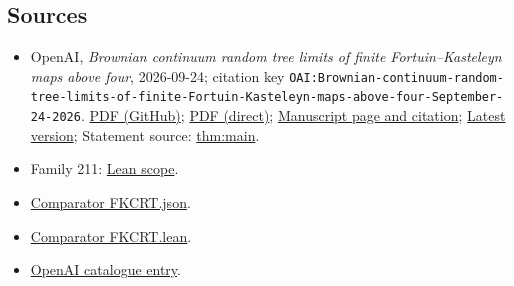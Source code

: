 \documentclass[11pt]{article}
\begin{document}
\subsection{Sources}
\begin{itemize}
\item OpenAI, \emph{Brownian continuum random tree limits of finite Fortuin–Kasteleyn maps above four}, 2026-09-24; citation key \texttt{OAI:Brownian-continuum-random-tree-limits-of-finite-Fortuin-Kasteleyn-maps-above-four-September-24-2026}. \href{https://github.com/openai/math/blob/adc7f1241b42e322a6451854ab7e4b4c146bf78a/preprints/Brownian-continuum-random-tree-limits-of-finite-Fortuin-Kasteleyn-maps-above-four-September-24-2026/main.pdf}{PDF (GitHub)}; \href{https://github.com/openai/math/raw/adc7f1241b42e322a6451854ab7e4b4c146bf78a/preprints/Brownian-continuum-random-tree-limits-of-finite-Fortuin-Kasteleyn-maps-above-four-September-24-2026/main.pdf}{PDF (direct)}; \href{https://github.com/openai/math/blob/adc7f1241b42e322a6451854ab7e4b4c146bf78a/preprints/Brownian-continuum-random-tree-limits-of-finite-Fortuin-Kasteleyn-maps-above-four-September-24-2026/README.md}{Manuscript page and citation}; \href{https://github.com/openai/math/blob/main/preprints/Brownian-continuum-random-tree-limits-of-finite-Fortuin-Kasteleyn-maps-above-four-September-24-2026/main.pdf}{Latest version}; Statement source: \href{https://github.com/openai/math/blob/adc7f1241b42e322a6451854ab7e4b4c146bf78a/preprints/Brownian-continuum-random-tree-limits-of-finite-Fortuin-Kasteleyn-maps-above-four-September-24-2026/build/main.tex\#L100}{thm:main}.
\item Family 211: \href{https://github.com/openai/math/blob/adc7f1241b42e322a6451854ab7e4b4c146bf78a/lean/docs/211.md}{Lean scope}.
\item \href{https://github.com/openai/math/blob/adc7f1241b42e322a6451854ab7e4b4c146bf78a/lean/ComparatorChallenges/FKCRT.json}{Comparator FKCRT.json}.
\item \href{https://github.com/openai/math/blob/adc7f1241b42e322a6451854ab7e4b4c146bf78a/lean/ComparatorChallenges/FKCRT.lean}{Comparator FKCRT.lean}.
\item \href{https://github.com/openai/math/blob/adc7f1241b42e322a6451854ab7e4b4c146bf78a/CONTENTS.md}{OpenAI catalogue entry}.
\end{itemize}
\end{document}
